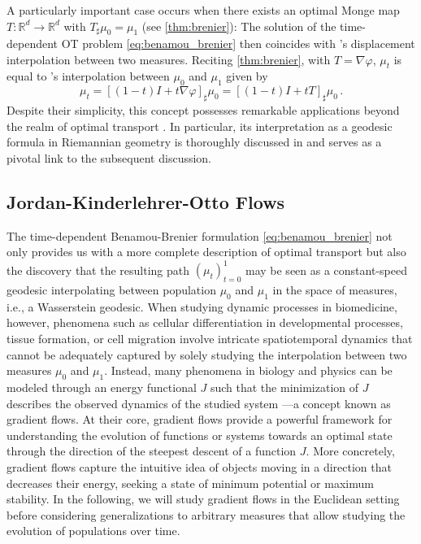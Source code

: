 A particularly important case occurs when there exists an optimal Monge map $T: \mathbb{R}^d \rightarrow \mathbb{R}^d$ with $T_\sharp \mu_0 = \mu_1$ (see \cref{thm:brenier}): The solution of the time-dependent OT problem \eqref{eq:benamou_brenier} then coincides with \citeauthor{mccann1997convexity}'s displacement interpolation between two measures.
Reciting \cref{thm:brenier}, with $T = \nabla \varphi$, $\mu_t$ is equal to \citeauthor{mccann1997convexity}'s interpolation between $\mu_0$ and $\mu_1$ given by
\begin{equation} \label{eq:mccann_interpolation}
	\mu_t = [(1-t) I+t \nabla \varphi]_\sharp \mu_0 = [(1-t) I+t T]_\sharp \mu_0\,.
\end{equation}
Despite their simplicity, this concept possesses remarkable applications beyond the realm of optimal transport \citep{bonneel2011displacement}. In particular, its interpretation as a geodesic formula in Riemannian geometry is thoroughly discussed in \citet{gangbo1996geometry} and serves as a pivotal link to the subsequent discussion.


\subsection{Jordan-Kinderlehrer-Otto Flows} \label{sec:background_jko}

The time-dependent Benamou-Brenier formulation \eqref{eq:benamou_brenier} not only provides us with a more complete description of optimal transport but also the discovery that the resulting path $(\mu_t)_{t=0}^1$ may be seen as a constant-speed geodesic interpolating between population $\mu_0$ and $\mu_1$ in the space of measures, i.e., a Wasserstein geodesic.
When studying dynamic processes in biomedicine, however, phenomena such as cellular differentiation in developmental processes, tissue formation, or cell migration involve intricate spatiotemporal dynamics that cannot be adequately captured by solely studying the interpolation between two measures $\mu_0$ and $\mu_1$.
Instead, many phenomena in biology and physics can be modeled through an energy functional $J$ such that the minimization of $J$ describes the observed dynamics of the studied system ---a concept known as gradient flows.
At their core, gradient flows provide a powerful framework for understanding the evolution of functions or systems towards an optimal state through the direction of the steepest descent of a function $J$. 
More concretely, gradient flows capture the intuitive idea of objects moving in a direction that decreases their energy, seeking a state of minimum potential or maximum stability. 
In the following, we will study gradient flows in the Euclidean setting before considering generalizations to arbitrary measures that allow studying the evolution of populations over time.

